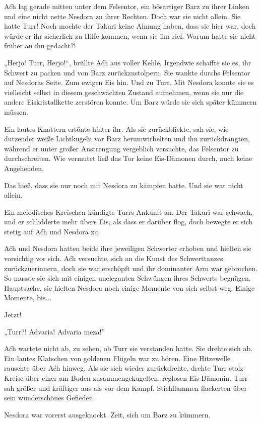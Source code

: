 Aćh lag gerade mitten unter dem Felsentor, ein bösartiger Barz zu ihrer Linken und eine nicht nette Nesdora zu ihrer Rechten. Doch war sie nicht allein. Sie hatte Turr! Noch mochte der Takuri keine Ahnung haben, dass sie hier war, doch würde er ihr sicherlich zu Hilfe kommen, wenn sie ihn rief. Warum hatte sie nicht früher an ihn gedacht?!

„Herjo! Turr, Herjo!“, brüllte Aćh aus voller Kehle. Irgendwie schaffte sie es, ihr Schwert zu packen und von Barz zurückzustolpern. Sie wankte durchs Felsentor auf Nesdoras Seite. Zum ewigen Eis hin. Und zu Turr. Mit Nesdora konnte sie es vielleicht selbst in diesem geschwächten Zustand aufnehmen, wenn sie nur die andere Eiskristallkette zerstören konnte. Um Barz würde sie sich später kümmern müssen.

Ein lautes Knattern ertönte hinter ihr. Als sie zurückblickte, sah sie, wie dutzender weiße Lichtkugeln vor Barz herumwirbelten und ihn zurückdrängten, während er unter großer Anstrengung vergeblich versuchte, das Felsentor zu durchschreiten. Wie vermutet ließ das Tor keine Eis-Dämonen durch, auch keine Angehenden.

Das hieß, dass sie nur noch mit Nesdora zu kämpfen hatte. Und sie war nicht allein.

Ein melodisches Kreischen kündigte Turrs Ankunft an. Der Takuri war schwach, und er schlidderte mehr übers Eis, als dass er darüber flog, doch bewegte er sich stetig auf Aćh und Nesdora zu.

Aćh und Nesdora hatten beide ihre jeweiligen Schwerter erhoben und hielten sie vorsichtig vor sich. Aćh versuchte, sich an die Kunst des Schwerttanzes zurückzuerinnern, doch sie war erschöpft und ihr dominanter Arm war gebrochen. So musste sie sich mit einigen uneleganten Schwüngen ihres Schwerts begnügen. Hauptsache, sie hielten Nesdora noch einige Momente von sich selbst weg. Einige Momente, bis...

Jetzt!

„Turr?! Advaria! Advaria meza!”

Aćh wartete nicht ab, zu sehen, ob Turr sie verstanden hatte. Sie drehte sich ab. Ein lautes Klatschen von goldenen Flügeln war zu hören. Eine Hitzewelle rauschte über Aćh hinweg. Als sie sich wieder zurückdrehte, drehte Turr stolz Kreise über einer am Boden zusammengekugelten, reglosen Eis-Dämonin. Turr sah größer und kräftiger aus als vor dem Kampf. Stichflammen flackerten über sein wunderschönes Gefieder.

Nesdora war vorerst ausgeknockt. Zeit, sich um Barz zu kümmern.

